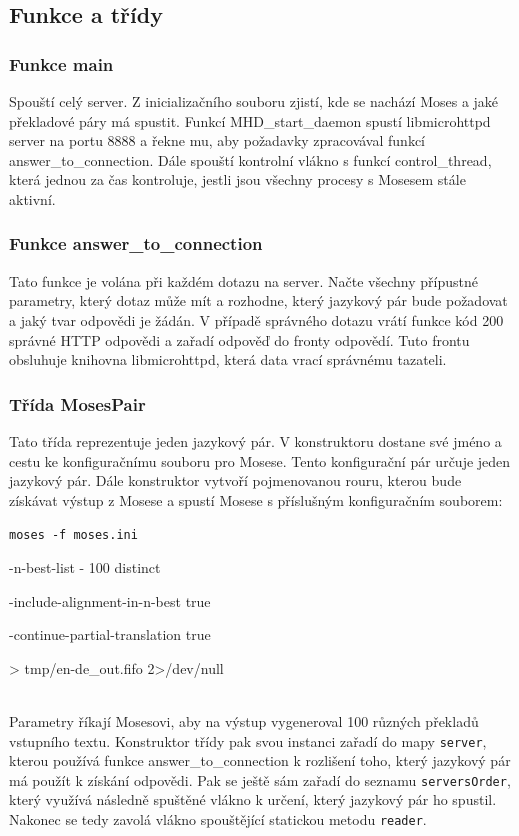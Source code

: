\documentclass[12pt,a4paper]{report}
\begin{document}
\subsection{Funkce a třídy}

\subsubsection{Funkce main}
Spouští celý server. Z inicializačního souboru zjistí, kde se nachází Moses a jaké překladové páry má spustit. Funkcí MHD\_start\_daemon spustí libmicrohttpd server na portu 8888 a řekne mu, aby požadavky zpracovával funkcí answer\_to\_connection. Dále spouští kontrolní vlákno s funkcí control\_thread, která jednou za čas kontroluje, jestli jsou všechny procesy s Mosesem stále aktivní.

\subsubsection{Funkce answer\_to\_connection}
Tato funkce je volána při každém dotazu na server. Načte všechny přípustné parametry, který dotaz může mít a rozhodne, který jazykový pár bude požadovat a jaký tvar odpovědi je žádán. V případě správného dotazu vrátí funkce kód 200 správné HTTP odpovědi a zařadí odpověď do fronty odpovědí. Tuto frontu obsluhuje knihovna libmicrohttpd, která data vrací správnému tazateli.

\subsubsection{Třída MosesPair}
Tato třída reprezentuje jeden jazykový pár. V konstruktoru dostane své jméno a cestu ke konfiguračnímu souboru pro Mosese. Tento konfigurační pár určuje jeden jazykový pár. Dále konstruktor vytvoří pojmenovanou rouru, kterou bude získávat výstup z Mosese a spustí Mosese s příslušným konfiguračním souborem: \\

{\tt moses -f moses.ini

-n-best-list - 100 distinct

-include-alignment-in-n-best true

-continue-partial-translation true

> tmp/en-de\_out.fifo 2>/dev/null } \\

Parametry říkají Mosesovi, aby na výstup vygeneroval 100 různých překladů vstupního textu. Konstruktor třídy pak svou instanci zařadí do mapy {\tt server}, kterou používá funkce answer\_to\_connection k rozlišení toho, který jazykový pár má použít k získání odpovědi. Pak se ještě sám zařadí do seznamu {\tt serversOrder}, který využívá následně spuštěné vlákno k určení, který jazykový pár ho spustil. Nakonec se tedy zavolá vlákno spouštějící statickou metodu {\tt reader}.
\end{document}

